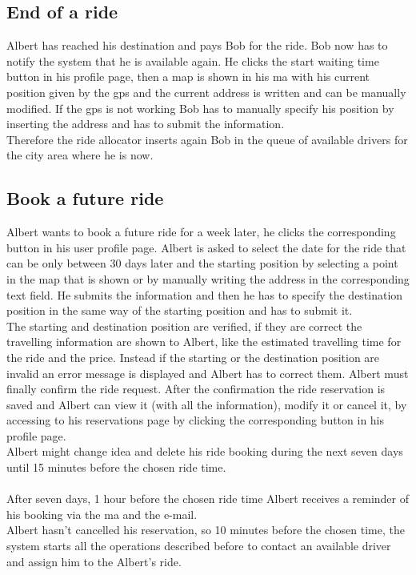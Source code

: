 \subsection{End of a ride}
Albert has reached his destination and pays Bob for the ride. Bob now has to notify the system that he is available again. He clicks the start waiting time button in his profile page, then a \gls{map} is shown in his \gls{ma} with his current position given by the \gls{gps} and the current address is written and can be manually modified. If the \gls{gps} is not working Bob has to manually specify his position by inserting the address and has to submit the information.\\
Therefore the ride allocator inserts again Bob in the queue of available \glspl{driver} for the city area where he is now.

\subsection{Book a future ride}
Albert wants to book a \gls{future} ride for a week later, he clicks the corresponding button in his user profile page. Albert is asked to select the date for the ride that can be only between 30 days later and the starting position by selecting a point in the \gls{map} that is shown or by manually writing the address in the corresponding text field. He submits the information and then he has to specify the destination position in the same way of the starting position and has to submit it.\\
The starting and destination position are verified, if they are correct the travelling information are shown to Albert, like the estimated travelling time for the ride and the price. Instead if the starting or the destination position are invalid an error message is displayed and Albert has to correct them. Albert must finally confirm the ride request. 
After the confirmation the ride \gls{reservation} is saved and Albert can view it (with all the information), modify it or cancel it, by accessing to his \glspl{reservation} page by clicking the corresponding button in his profile page.\\
Albert might change idea and delete his ride booking during the next seven days until 15 minutes before the chosen ride time.\\
\\
After seven days, 1 hour before the chosen ride time Albert receives a reminder of his booking via the \gls{ma} and the e-mail.\\
Albert hasn't cancelled his \gls{reservation}, so 10 minutes before the chosen time, the system starts all the operations described before to contact an available \gls{driver} and assign him to the Albert's ride.

